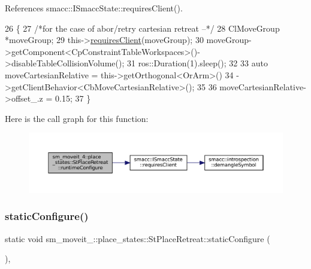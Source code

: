 References smacc\+::\+I\+Smacc\+State\+::requires\+Client().


\begin{DoxyCode}
26     \{
27         \textcolor{comment}{/*for the case of abor/retry cartesian retreat --*/}
28         ClMoveGroup *moveGroup;
29         this->\hyperlink{classsmacc_1_1ISmaccState_a7f95c9f0a6ea2d6f18d1aec0519de4ac}{requiresClient}(moveGroup);
30         moveGroup->getComponent<CpConstraintTableWorkspaces>()->disableTableCollisionVolume();
31         ros::Duration(1).sleep();
32         
33         \textcolor{keyword}{auto} moveCartesianRelative = this->getOrthogonal<OrArm>()
34                                          ->getClientBehavior<CbMoveCartesianRelative>();
35 
36         moveCartesianRelative->offset\_.z = 0.15;
37     \}
\end{DoxyCode}
Here is the call graph for this function\+:
\nopagebreak
\begin{figure}[H]
\begin{center}
\leavevmode
\includegraphics[width=350pt]{structsm__moveit__4_1_1place__states_1_1StPlaceRetreat_a592a95bb086fd10381dee175af55e71e_cgraph}
\end{center}
\end{figure}
\mbox{\label{structsm__moveit__4_1_1place__states_1_1StPlaceRetreat_aa3f44a56c5471fb113afb7b3cfd7d44e}} 
\subsubsection{\texorpdfstring{static\+Configure()}{staticConfigure()}}
{\footnotesize\ttfamily static void sm\+\_\+moveit\+\_\+::place\+\_\+states\+::\+St\+Place\+Retreat\+::static\+Configure (\begin{DoxyParamCaption}{ }\end{DoxyParamCaption})\hspace{0.3cm}{\ttfamily [inline]}, {\ttfamily [static]}}



